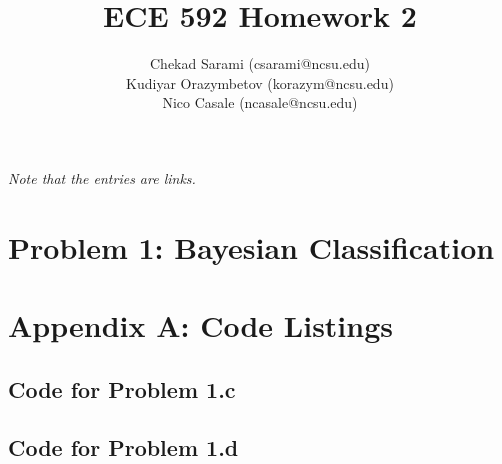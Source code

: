 \documentclass[]{../ncmathy}
\begin{document}
\title{ECE 592 Homework 2}
\author{Chekad Sarami (csarami@ncsu.edu)\\Kudiyar Orazymbetov (korazym@ncsu.edu)\\Nico Casale (ncasale@ncsu.edu)}
\maketitle

\textit{Note that the entries are links.}
\tableofcontents
\listoffigures
\lstlistoflistings

\pagebreak

\section{Problem 1: Bayesian Classification}

	

\pagebreak

	

\pagebreak

\section{Appendix A: Code Listings}
	\subsection{Code for Problem 1.c}
	\subsubsection{}
	
	
	\subsection{Code for Problem 1.d}
		\subsubsection{}
			
\end{document}
